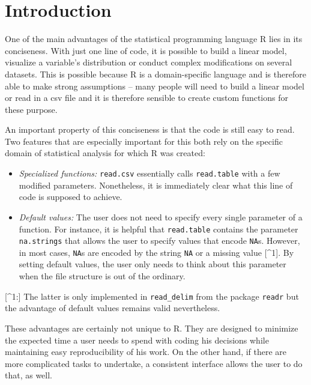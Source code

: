 \documentclass[]{report}
\theoremstyle{definition}
\theoremstyle{definition}
\theoremstyle{definition}
\theoremstyle{remark}
\begin{document}
\tableofcontents

\chapter{Introduction}\label{intro}

 \setcounter{page}{1}

One of the main advantages of the statistical programming language R
\citep{R} lies in its conciseness. With just one line of code, it is
possible to build a linear model, visualize a variable's distribution or
conduct complex modifications on several datasets. This is possible
because R is a domain-specific language and is therefore able to make
strong assumptions -- many people will need to build a linear model or
read in a csv file and it is therefore sensible to create custom
functions for these purpose.

An important property of this conciseness is that the code is still easy
to read. Two features that are especially important for this both rely
on the specific domain of statistical analysis for which R was created:

\begin{itemize}
\item
  \emph{Specialized functions:} \texttt{read.csv} essentially calls
  \texttt{read.table} with a few modified parameters. Nonetheless, it is
  immediately clear what this line of code is supposed to achieve.
\item
  \emph{Default values:} The user does not need to specify every single
  parameter of a function. For instance, it is helpful that
  \texttt{read.table} contains the parameter \texttt{na.strings} that
  allows the user to specify values that encode \texttt{NA}s. However,
  in most cases, \texttt{NA}s are encoded by the string \texttt{NA} or a
  missing value {[}\^{}1{]}. By setting default values, the user only
  needs to think about this parameter when the file structure is out of
  the ordinary.
\end{itemize}

{[}\^{}1:{]} The latter is only implemented in \texttt{read\_delim} from
the package \texttt{readr} but the advantage of default values remains
valid nevertheless.

These advantages are certainly not unique to R. They are designed to
minimize the expected time a user needs to spend with coding his
decisions while maintaining easy reproducibility of his work. On the
other hand, if there are more complicated tasks to undertake, a
consistent interface allows the user to do that, as well.
\end{document}
